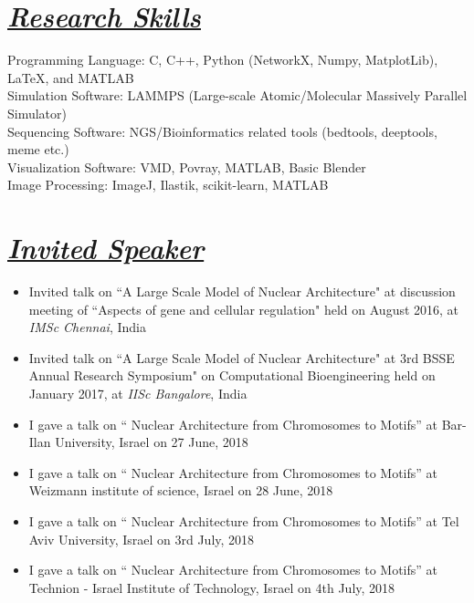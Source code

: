 \documentclass{res}
\begin{document}
\begin{resume}
\begin{itemize}
\section{\sl \underline{Research Skills}}
Programming Language: C, C++, Python (NetworkX, Numpy, MatplotLib), LaTeX, and MATLAB\\
Simulation Software: LAMMPS (Large-scale Atomic/Molecular Massively Parallel Simulator) \\
Sequencing Software: NGS/Bioinformatics related tools (bedtools, deeptools, meme etc.) \\
Visualization Software: VMD, Povray, MATLAB, Basic Blender \\
Image Processing: ImageJ, Ilastik, scikit-learn, MATLAB 



\section{\sl  \underline{Invited Speaker}} 
\begin{itemize}
\item Invited talk on ``A Large Scale Model of Nuclear Architecture" at discussion meeting of ``Aspects of gene and cellular regulation"  held on August 2016, at {\it IMSc Chennai}, India  
\item Invited talk on ``A Large Scale Model of Nuclear Architecture" at 3rd BSSE Annual Research Symposium" on Computational Bioengineering held on January 2017, at {\it IISc Bangalore}, India
\item I gave a talk on `` Nuclear Architecture from Chromosomes to Motifs'' at Bar-Ilan University, Israel on 27 June, 2018
\item I gave a talk on `` Nuclear Architecture from Chromosomes to Motifs'' at Weizmann institute of science, Israel on 28 June, 2018
\item I gave a talk on `` Nuclear Architecture from Chromosomes to Motifs'' at Tel Aviv University, Israel on 3rd July, 2018
\item I gave a talk on `` Nuclear Architecture from Chromosomes to Motifs'' at Technion - Israel Institute of Technology, Israel on 4th July, 2018
\end{itemize}


\end{itemize}
\end{resume}
\end{document}
